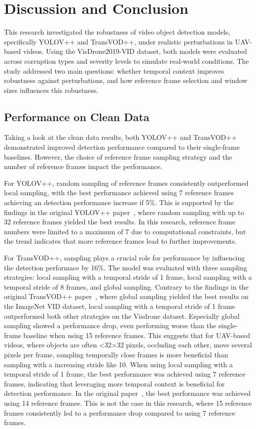 \documentclass[final,twoside]{vutinfth}
\begin{document}
\chapter{Discussion and Conclusion}
This research investigated the robustness of video object detection models, specifically YOLOV++ and TransVOD++, under realistic perturbations in UAV-based videos.
Using the VisDrone2019-VID dataset, both models were evaluated across corruption types and severity levels to simulate real-world conditions.
The study addressed two main questions: whether temporal context improves robustness against perturbations, and how reference frame selection and window sizes influences this robustness.
\section{Performance on Clean Data}
Taking a look at the clean data results, both YOLOV++ and TransVOD++ demonstrated improved detection performance compared to their single-frame baselines.
However, the choice of reference frame sampling strategy and the number of reference frames impact the performance.


For YOLOV++, random sampling of reference frames consistently outperformed local sampling, with the best performance achieved using 7 reference frames achieving an detection performance increase if 5\%.
This is supported by the findings in the original YOLOV++ paper~\cite{shi2024yolovpp}, where random sampling with up to 32 reference frames yielded the best results.
In this research, reference frame numbers were limited to a maximum of 7 due to computational constraints, but the trend indicates that more reference frames lead to further improvements.

For TransVOD++, sampling plays a crucial role for performance by influencing the detection performace by 16\%. The model was evaluated with three sampling strategies: local sampling with a temporal stride of 1 frame, local sampling with a temporal stride of 8 frames, and global sampling.
Contrary to the findings in the original TransVOD++ paper~\cite{zhou2023transvodpp}, where global sampling yielded the best results on the ImageNet VID dataset, local sampling with a temporal stride of 1 frame outperformed both other strategies on the Visdrone dataset.
Especially global sampling showed a performance drop, even performing worse than the single-frame baseline when using 15 reference frames.
This suggests that for UAV-based videos, where objects are often <32$\times$32 pixels, occluding each other, move several pixels per frame, sampling temporally close frames is more beneficial than sampling with a increasing stride like 10.
When using local sampling with a temporal stride of 1 frame, the best performance was achieved using 7 reference frames, indicating that leveraging more temporal context is beneficial for detection performance.
In the original paper~\cite{zhou2023transvodpp}, the best performance was achieved using 14 reference frames. This is not the case in this research, where 15 reference frames consistently led to a performance drop compared to using 7 reference frames.
\end{document}
